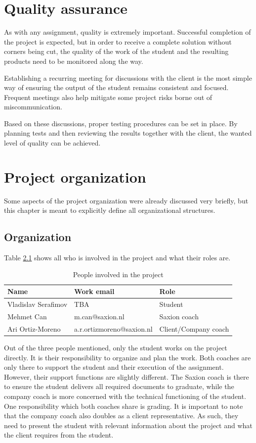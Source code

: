 \documentclass{report}
\begin{document}
	
	\chapter{Quality assurance}\label{quality_assurance}
	As with any assignment, quality is extremely important. Successful completion of the project is expected, but in order to receive a complete solution without corners being cut, the quality of the work of the student and the resulting products need to be monitored along the way.
	
	Establishing a recurring meeting for discussions with the client is the most simple way of ensuring the output of the student remains consistent and focused. Frequent meetings also help mitigate some project risks borne out of miscommunication.
	
	Based on these discussions, proper testing procedures can be set in place. By planning tests and then reviewing the results together with the client, the wanted level of quality can be achieved.
	
	\chapter{Project organization}
	Some aspects of the project organization were already discussed very briefly, but this chapter is meant to explicitly define all organizational structures.
	
	\section{Organization}
	Table \ref{involved} shows all who is involved in the project and what their roles are.
	
	\begin{table}[h]
		\centering
		\begin{tabular}{|l|l|l|}
			\hline
			Name                & Work email              & Role          \\ \hline
			Vladislav Serafimov & TBA   & Student       \\ \hline
			Mehmet Can   & m.can@saxion.nl & Saxion coach  \\ \hline
			Ari Ortiz-Moreno   & a.r.ortizmoreno@saxion.nl     & Client/Company coach \\ \hline
		\end{tabular}
		\caption{People involved in the project}
		\label{involved}
	\end{table}
	
	Out of the three people mentioned, only the student works on the project directly. It is their responsibility to organize and plan the work. Both coaches are only there to support the student and their execution of the assignment. However, their support functions are slightly different. The Saxion coach is there to ensure the student delivers all required documents to graduate, while the company coach is more concerned with the technical functioning of the student. One responsibility which both coaches share is grading. It is important to note that the company coach also doubles as a client representative. As such, they need to present the student with relevant information about the project and what the client requires from the student.
	
\end{document}
